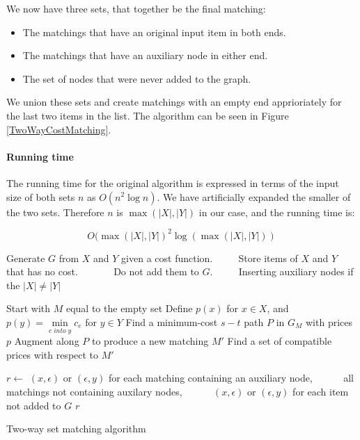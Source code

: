 \documentclass[11pt]{article}
\begin{document}
\endgroup

We now have three sets, that together be the final matching:
\begin{itemize}
   \item The matchings that have an original input item in both ends.
   \item The matchings that have an auxiliary node in either end.
   \item The set of nodes that were never added to the graph.
\end{itemize}

We union these sets and create matchings with an empty end apprioriately for the last two items in the list. The algorithm can be seen in Figure \ref{TwoWayCostMatching}.

\paragraph{Running time} The running time for the original algorithm is expressed in terms of the input size of both sets $n$ as $O(n^2 \log n)$. We have artificially expanded the smaller of the two sets. Therefore $n$ is $\max(|X|, |Y|)$ in our case, and the running time is:

\begin{equation}
O(\max(|X|, |Y|)^2 \log (\max(|X|, |Y|)) \nonumber
\end{equation}


\begin{algorithm}
\begin{algorithmic}
	\State Generate $G$ from $X$ and $Y$ given a cost function.
	\State ~~~~ Store items of $X$ and $Y$ that has no cost.
	\State ~~~~~~ Do not add them to $G$.
	\State ~~~~ Inserting auxiliary nodes if the $|X| \neq |Y|$


	\State Start with $M$ equal to the empty set
	\State Define $p(x)$ for $x \in X$, and  $p(y) = \underset{e \; into \; y}{\operatorname{min}} c_e$ for $y \in Y$
    	\State Find a minimum-cost $s-t$ path $P$ in $G_M$ with prices $p$
    	\State Augment along $P$ to produce a new matching $M'$
    	\State Find a set of compatible prices with respect to $M'$
    \EndWhile
    
	\State $r \gets $  $(x, \epsilon)$ or $(\epsilon, y)$ for each matching containing an auxiliary node, 
    \State ~~~~~ all matchings not containing auxilary nodes,
    \State ~~~~~ $(x, \epsilon)$ or $(\epsilon, y)$ for each item not added to $G$    
    \State \Return $r$
\EndFunction
\end{algorithmic}
\caption{Two-way set matching algorithm}
\label{TwoWayCostMatching}
\end{algorithm}
\end{document}
